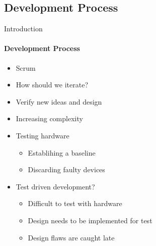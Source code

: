 \subsection{Development Process}
\begin{frame}[t]{Introduction}\framesubtitle{Development Process}
    \begin{itemize}
        \item<1-> Scrum
        \item<1-> How should we iterate?
        \item<2-> Verify new ideas and design
        \item<2-> Increasing complexity
        \item<3-> Testing hardware
            \begin{itemize}
                \item<3-> Establihing a baseline
                \item<3-> Discarding faulty devices
            \end{itemize}
        \item<4-> Test driven development?
        \begin{itemize}
            \item<4-> Difficult to test with hardware
            \item<4-> Design needs to be implemented for test
            \item<4-> Design flaws are caught late
        \end{itemize}
    \end{itemize}
\end{frame}

